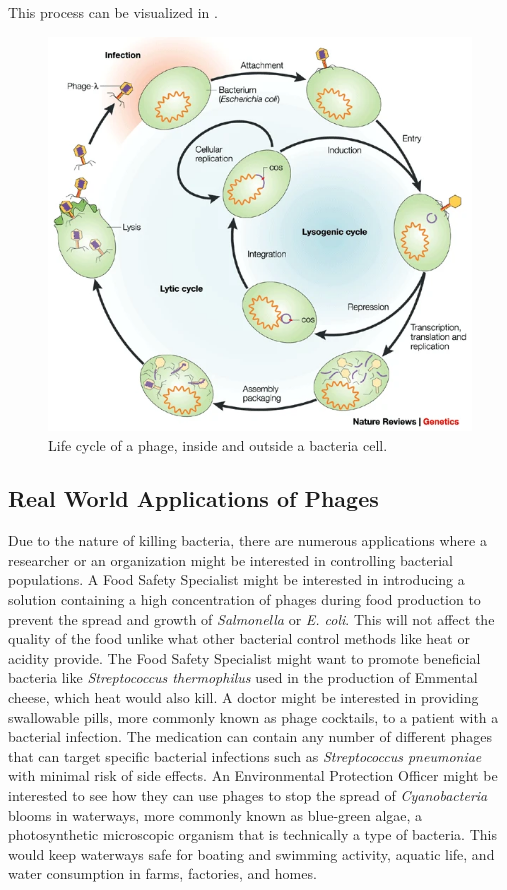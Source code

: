 This process can be visualized in . \cite{campbellFutureBacteriophageBiology2003}
\begin{figure}
    \centering
    \includegraphics[width=0.5\linewidth]{Chapters/Figures/phage_life_cycle.png}
    \caption{Life cycle of a phage, inside and outside a bacteria cell.}
    \label{fig:phage_life_cycle}
\end{figure}

\subsection{Real World Applications of Phages}
Due to the nature of killing bacteria, there are numerous applications where a researcher or an organization might be interested in controlling bacterial populations. A Food Safety Specialist might be interested in introducing a solution containing a high concentration of phages during food production to prevent the spread and growth of \textit{Salmonella} or \textit{E. coli}. This will not affect the quality of the food unlike what other bacterial control methods like heat or acidity provide. The Food Safety Specialist might want to promote beneficial bacteria like \textit{Streptococcus thermophilus} used in the production of Emmental cheese, which heat would also kill. A doctor might be interested in providing swallowable pills, more commonly known as phage cocktails, to a patient with a bacterial infection. The medication can contain any number of different phages that can target specific bacterial infections such as \textit{Streptococcus pneumoniae} with minimal risk of side effects. An Environmental Protection Officer might be interested to see how they can use phages to stop the spread of \textit{Cyanobacteria} blooms in waterways, more commonly known as blue-green algae, a photosynthetic microscopic organism that is technically a type of bacteria. This would keep waterways safe for boating and swimming activity, aquatic life, and water consumption in farms, factories, and homes. 


